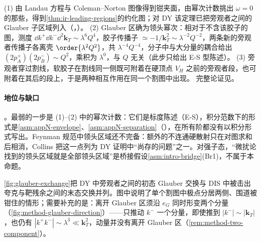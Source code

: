 \begin{proofsketch}
(1) 由 Landau 方程与 Coleman--Norton 图像得到钳夹面，由幂次计数挑出 $\omega=0$ 的那些，得到\cref{thm:ir-leading-regions}的约化图；对 DY 该定理已把旁观者之间的 Glauber 子区域列入（\cite[第~5.8--5.11~节]{Collins2011}，\cite[第~8.7~节]{CollinsSoperSterman1989}）。
(2) Glauber 区确为领头幂次：相对于不含该胶子的图，测度 $\dd k^+\dd k^-\dd^2\mathbf k_T\sim\lambda^6Q^4$，胶子传播子 $\simeq-1/\mathbf k_T^2\sim\lambda^{-2}Q^{-2}$，两条新的旁观者传播子各离壳 $\order{\lambda^2Q^2}$，共 $\lambda^{-4}Q^{-4}$，分子中与大分量的耦合给出 $(2p_A^+)(2p_B^-)\sim Q^2$，乘积为 $\lambda^0$，与 $Q$ 无关\cite[第~5.6.2~节]{Collins2011}（此步只给出 E-S 型陈述）。
(3) 旁观者穿过割线，软胶子在割线同一侧既可附着在硬顶点 $V_H$ 之前的旁观者段，也可附着在其后的段上，于是两种相互作用在同一个割图中出现。
完整论证见\cite[第~5~章与第~14.3~节]{Collins2011}。
\end{proofsketch}

\paragraph{地位与缺口}\tagA。最弱的一步是 (1)–(2) 中的幂次计数：它们是标度陈述（E-S），积分范数下的形式是\cref{asm:appN-envelope}、\cref{asm:appN-separation}（\tagA），在所有阶都没有以积分形式写出。Feynman 规范中领头区域还不完备：额外的不连通硬散射只在对图求和后相消\cite{Labastida:1984gy}，Collins 把这一点列为 DY 证明中“尚存的问题”之一\cite[第~14.4.8~节]{Collins2011}。对强子态，“微扰论找到的领头区域就是全部领头区域”是桥接假设\cref{asm:intro-bridge}(Br1)，不属于本命题。

\cref{fig:glauber-exchange}把 DY 中旁观者之间的初态 Glauber 交换与 DIS 中被击出夸克与靶残余之间的末态交换并列。图中说明了单个割图中极点分居两侧、围道被钳住的情形；需要补充的是：离开 Glauber 区须沿 $e_G$ 同时形变两个分量（\cref{fig:method-glauber-direction}）——只推动 $k^-$ 一个分量，即使推到 $|k^-|\sim|\mathbf k_T|$，也仍有 $|k^+k^-|\sim\lambda^3\ll\mathbf k_T^2$，动量并没有离开 Glauber 区（\cref{rem:method-two-component}）。

